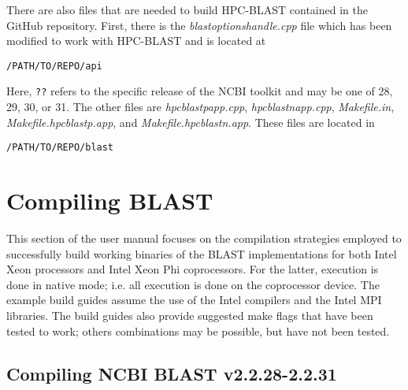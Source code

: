 \documentclass[10pt]{article}
\begin{document}
There are also files that are needed to build HPC-BLAST contained in the GitHub repository.  First, there is the \emph{blast\textunderscore options\textunderscore handle.cpp} file which has been modified to work with HPC-BLAST and is located at
\begin{verbatim}
/PATH/TO/REPO/api
\end{verbatim}
\noindent Here, \verb^??^ refers to the specific release of the NCBI toolkit and may be one of %
28, 29, 30, or 31.  The other files are \emph{hpc\textunderscore blastp\textunderscore app.cpp}, \emph{hpc\textunderscore blastn\textunderscore app.cpp}, \emph{Makefile.in},
\emph{Makefile.hpc\textunderscore blastp.app}, and \emph{Makefile.hpc\textunderscore blastn.app}.
These files are located in
\begin{verbatim}
/PATH/TO/REPO/blast
\end{verbatim}


\clearpage

\section{Compiling BLAST} \label{sec:compile}

This section of the user manual focuses on the compilation strategies employed to successfully build working binaries of the BLAST implementations for both Intel Xeon processors and Intel Xeon Phi coprocessors.  For the latter, execution is done in native
mode; i.e. all execution is done on the coprocessor device.  The example build guides assume the use of the Intel compilers and the Intel MPI libraries.  The build guides also provide suggested make flags that have been tested to work; others combinations
may be possible, but have not been tested.\\


\subsection{Compiling NCBI BLAST v2.2.28-2.2.31} \label{ssec:ncbi-compile}
\end{document}
